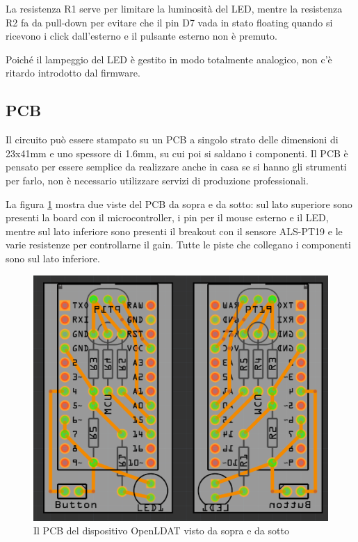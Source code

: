 La resistenza R1 serve per limitare la luminosità del LED, mentre la resistenza R2 fa da pull-down per evitare che il pin D7 vada in stato floating quando si ricevono i click dall'esterno e il pulsante esterno non è premuto.

Poiché il lampeggio del LED è gestito in modo totalmente analogico, non c'è ritardo introdotto dal firmware.

\subsection{PCB}
Il circuito può essere stampato su un PCB a singolo strato delle dimensioni di 23x41mm e uno spessore di 1.6mm, su cui poi si saldano i componenti. Il PCB è pensato per essere semplice da realizzare anche in casa se si hanno gli strumenti per farlo, non è necessario utilizzare servizi di produzione professionali.

La figura \ref{fig:pcb} mostra due viste del PCB da sopra e da sotto: sul lato superiore sono presenti la board con il microcontroller, i pin per il mouse esterno e il LED, mentre sul lato inferiore sono presenti il breakout con il sensore ALS-PT19 e le varie resistenze per controllarne il gain. Tutte le piste che collegano i componenti sono sul lato inferiore.
\begin{figure}[h]
	\centering
	\includegraphics[width=\textwidth]{Chapter03/res/openldat_pcb.png}
	\caption{Il PCB del dispositivo OpenLDAT visto da sopra e da sotto}
	\label{fig:pcb}
\end{figure}

